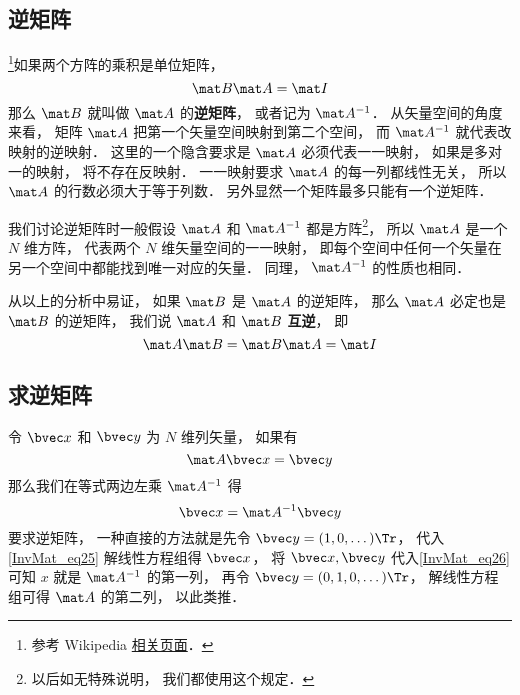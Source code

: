 
\begin{issues}
\issueTODO
\end{issues}


\subsection{逆矩阵}

\footnote{参考 Wikipedia \href{https://en.wikipedia.org/wiki/Invertible_matrix}{相关页面}．}如果两个方阵的乘积是单位矩阵， 
\begin{equation}
\mat B \mat A = \mat I
\end{equation}
那么 $\mat B$ 就叫做 $\mat A$ 的\textbf{逆矩阵}， 或者记为 $\mat A^{-1}$． 从矢量空间的角度来看， 矩阵 $\mat A$ 把第一个矢量空间映射到第二个空间， 而 $\mat A^{-1}$ 就代表改映射的逆映射． 这里的一个隐含要求是 $\mat A$ 必须代表一一映射， 如果是多对一的映射， 将不存在反映射． 一一映射要求 $\mat A$ 的每一列都线性无关，%
所以 $\mat A$ 的行数必须大于等于列数． 另外显然一个矩阵最多只能有一个逆矩阵．

我们讨论逆矩阵时一般假设 $\mat A$ 和 $\mat A^{-1}$ 都是方阵\footnote{以后如无特殊说明， 我们都使用这个规定．}， 所以 $\mat A$ 是一个 $N$ 维方阵， 代表两个 $N$ 维矢量空间的一一映射， 即每个空间中任何一个矢量在另一个空间中都能找到唯一对应的矢量． 同理， $\mat A^{-1}$ 的性质也相同．

从以上的分析中易证， 如果 $\mat B$ 是 $\mat A$ 的逆矩阵， 那么 $\mat A$ 必定也是 $\mat B$ 的逆矩阵， 我们说 $\mat A$ 和 $\mat B$ \textbf{互逆}， 即
\begin{equation}\label{InvMat_eq2}
\mat A \mat B = \mat B \mat A = \mat I
\end{equation}

\subsection{求逆矩阵}
令 $\bvec x$ 和 $\bvec y$ 为 $N$ 维列矢量， 如果有
\begin{equation}\label{InvMat_eq25}
\mat A \bvec x = \bvec y
\end{equation}
那么我们在等式两边左乘 $\mat A^{-1}$ 得
\begin{equation}\label{InvMat_eq26}
\bvec x = \mat A^{-1} \bvec y
\end{equation}
要求逆矩阵， 一种直接的方法就是先令 $\bvec y = (1, 0, \dots)\Tr$， 代入\autoref{InvMat_eq25} 解线性方程组得 $\bvec x$， 将 $\bvec x, \bvec y$ 代入\autoref{InvMat_eq26} 可知 $x$ 就是 $\mat A^{-1}$ 的第一列， 再令 $\bvec y = (0, 1, 0, \dots)\Tr$， 解线性方程组可得 $\mat A$ 的第二列， 以此类推．

